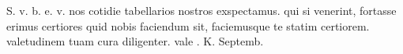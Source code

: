 


S. v. b. e. v. nos cotidie tabellarios nostros exspectamus. qui si venerint, fortasse erimus certiores quid nobis faciendum sit, faciemusque te statim certiorem. valetudinem tuam cura diligenter. vale .  K. Septemb.
